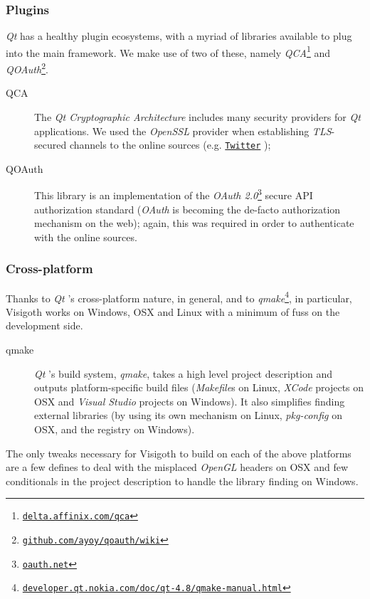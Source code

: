 \documentclass[a4paper,11pt,titlepage]{article}
\let\stdhref\href
\renewcommand{\href}[2]{\stdhref{#1}{\texttt{#2}}}
\newcommand{\buzz}[1]{\emph{#1}}
\newcommand{\myhref}[1]{\href{http://#1}{#1}}
\newcommand{\Qt}{\buzz{Qt} }
\newcommand{\OpenGL}{\buzz{OpenGL} }
\newcommand{\Twitter}{\href{http://twitter.com}{Twitter} }
\begin{document}
\subsubsection{Plugins}

\Qt has a healthy plugin ecosystems, with a myriad of libraries
available to plug into the main framework. We make use of two of
these, namely
\buzz{QCA}\footnote{\myhref{delta.affinix.com/qca}} and
\buzz{QOAuth}\footnote{\href{https://github.com/ayoy/qoauth/wiki}{github.com/ayoy/qoauth/wiki}}.

\begin{description}
\item [QCA] The \buzz{Qt Cryptographic Architecture} includes many
  security providers for \Qt applications. We used the \buzz{OpenSSL}
  provider when establishing \buzz{TLS}-secured channels to the online
  sources (e.g. \Twitter);
\item [QOAuth] This library is an implementation of the \buzz{OAuth
  2.0}\footnote{\myhref{oauth.net}} secure API authorization
  standard (\buzz{OAuth} is becoming the de-facto authorization
  mechanism on the web); again, this was required in order to
  authenticate with the online sources.
\end{description}

\subsubsection{Cross-platform}

Thanks to \Qt's cross-platform nature, in general, and to
\buzz{qmake}\footnote{\myhref{developer.qt.nokia.com/doc/qt-4.8/qmake-manual.html}},
in particular, Visigoth works on Windows, OSX and Linux with a minimum
of fuss on the development side.

\begin{description}
\item [qmake] \Qt's build system, \buzz{qmake}, takes a high level
  project description and outputs platform-specific build files
  (\buzz{Makefile}s on Linux, \buzz{XCode} projects on OSX and
  \buzz{Visual Studio} projects on Windows). It also simplifies
  finding external libraries (by using its own mechanism on Linux,
  \buzz{pkg-config} on OSX, and the registry on Windows).
\end{description}

The only tweaks necessary for Visigoth to build on each of the above
platforms are a few defines to deal with the misplaced \OpenGL headers
on OSX and few conditionals in the project description to handle the
library finding on Windows.
\end{document}
